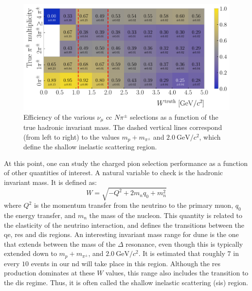 \begin{figure}[t]
    \centering
    \includegraphics[width=.90\linewidth]{Images/GAr_selection/pion_selection_efficiency_versus_invariant_mass.pdf}
    \caption[Efficiency of the $\nu_{\mu}$ \gls{cc} $N\pi^{\pm}$ selections as a function of the hadronic invariant mass.]{Efficiency of the various $\nu_{\mu}$ \gls{cc} $N\pi^{\pm}$ selections as a function of the true hadronic invariant mass. The dashed vertical lines correspond (from left to right) to the values $m_{p}+m_{\pi^{\pm}}$ and $2.0~\mathrm{GeV}/c^{2}$, which define the shallow inelastic scattering region.}
    \label{fig:efficiency_vs_invariant_mass}
\end{figure}

At this point, one can study the charged pion selection performance as a function of other quantities of interest. A natural variable to check is the hadronic invariant mass. It is defined as:
\begin{equation}
W = \sqrt{-Q^{2} + 2 m_{n} q_{0} + m_{n}^{2}}
\end{equation}
where $Q^{2}$ is the momentum transfer from the neutrino to the primary muon, $q_{0}$ the energy transfer, and $m_{n}$ the mass of the nucleon. This quantity is related to the elasticity of the neutrino interaction, and defines the transitions between the \gls{qe}, \gls{res} and \gls{dis} regions. An interesting invariant mass range for \gls{dune} is the one that extends between the mass of the $\Delta$ resonance, even though this is typically extended down to $m_{p}+m_{\pi^{\pm}}$, and $2.0~\mathrm{GeV}/c^{2}$. It is estimated that roughly $7$ in every $10$ events in our \gls{nd} will take place in this region. Although the \gls{res} production dominates at these $W$ values, this range also includes the transition to the \gls{dis} regime. Thus, it is often called the shallow inelastic scattering (\gls{sis}) region.

